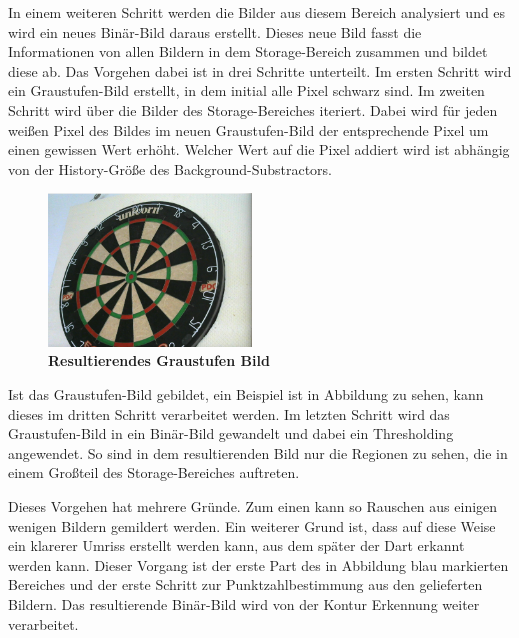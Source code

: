In einem weiteren Schritt werden die Bilder aus diesem Bereich analysiert und es wird ein neues Binär-Bild daraus erstellt. Dieses neue Bild fasst die Informationen von allen Bildern in dem Storage-Bereich zusammen und bildet diese ab.
Das Vorgehen dabei ist in drei Schritte unterteilt.
Im ersten Schritt wird ein Graustufen-Bild erstellt, in dem initial alle Pixel schwarz sind. 
Im zweiten Schritt wird über die Bilder des Storage-Bereiches iteriert. Dabei wird für jeden weißen Pixel des Bildes im neuen Graustufen-Bild der entsprechende Pixel um einen gewissen Wert erhöht. Welcher Wert auf die Pixel addiert wird ist abhängig von der History-Größe des Background-Substractors.
\begin{figure}[ht]
\centering
\includegraphics[width=0.48\textwidth]{media/undetected.png}
\caption{\textbf{Resultierendes Graustufen Bild}}
\label{Fig:greyimg}
\end{figure}
Ist das Graustufen-Bild gebildet, ein Beispiel ist in Abbildung  zu sehen, kann dieses im dritten Schritt verarbeitet werden. 
Im letzten Schritt wird das Graustufen-Bild in ein Binär-Bild gewandelt und dabei ein Thresholding angewendet. So sind in dem resultierenden Bild nur die Regionen zu sehen, die in einem Großteil des Storage-Bereiches auftreten. 

Dieses Vorgehen hat mehrere Gründe. 
Zum einen kann so Rauschen aus einigen wenigen Bildern gemildert werden. 
Ein weiterer Grund ist, dass auf diese Weise ein klarerer Umriss erstellt werden kann, aus dem später der Dart erkannt werden kann. 
Dieser Vorgang ist der erste Part des in Abbildung  blau markierten Bereiches und der erste Schritt zur Punktzahlbestimmung aus den gelieferten Bildern. Das resultierende Binär-Bild wird von der Kontur Erkennung weiter verarbeitet.

